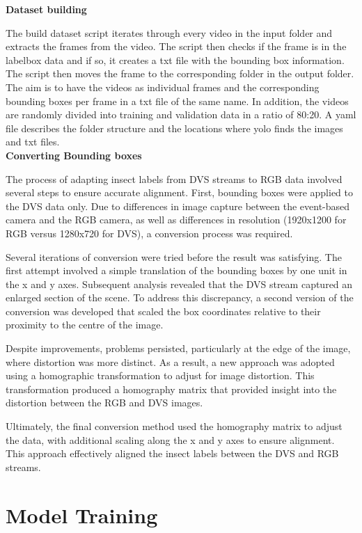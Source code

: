 \textbf{Dataset building}

The build dataset script iterates through every video in the input folder and extracts the frames from the video. The script then checks if the frame is in the labelbox data and if so, it creates a txt file with the bounding box information. The script then moves the frame to the corresponding folder in the output folder. The aim is to have the videos as individual frames and the corresponding bounding boxes per frame in a txt file of the same name. In addition, the videos are randomly divided into training and validation data in a ratio of 80:20. A yaml file describes the folder structure and the locations where yolo finds the images and txt files. \\

\textbf{Converting Bounding boxes}

The process of adapting insect labels from DVS streams to RGB data involved several steps to ensure accurate alignment. First, bounding boxes were applied to the DVS data only. Due to differences in image capture between the event-based camera and the RGB camera, as well as differences in resolution (1920x1200 for RGB versus 1280x720 for DVS), a conversion process was required.

Several iterations of conversion were tried before the result was satisfying. The first attempt involved a simple translation of the bounding boxes by one unit in the x and y axes. Subsequent analysis revealed that the DVS stream captured an enlarged section of the scene. To address this discrepancy, a second version of the conversion was developed that scaled the box coordinates relative to their proximity to the centre of the image.

Despite improvements, problems persisted, particularly at the edge of the image, where distortion was more distinct. As a result, a new approach was adopted using a homographic transformation to adjust for image distortion. This transformation produced a homography matrix that provided insight into the distortion between the RGB and DVS images.

Ultimately, the final conversion method used the homography matrix to adjust the data, with additional scaling along the x and y axes to ensure alignment. This approach effectively aligned the insect labels between the DVS and RGB streams.

\section{Model Training}


